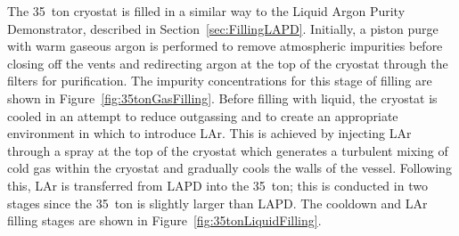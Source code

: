The 35~ton cryostat is filled in a similar way to the Liquid Argon Purity Demonstrator, described in Section~\ref{sec:FillingLAPD}.  Initially, a piston purge with warm gaseous argon is performed to remove atmospheric impurities before closing off the vents and redirecting argon at the top of the cryostat through the filters for purification.  The impurity concentrations for this stage of filling are shown in Figure~\ref{fig:35tonGasFilling}.  Before filling with liquid, the cryostat is cooled in an attempt to reduce outgassing and to create an appropriate environment in which to introduce LAr.  This is achieved by injecting LAr through a spray at the top of the cryostat which generates a turbulent mixing of cold gas within the cryostat and gradually cools the walls of the vessel.  Following this, LAr is transferred from LAPD into the 35~ton; this is conducted in two stages since the 35~ton is slightly larger than LAPD.  The cooldown and LAr filling stages are shown in Figure~\ref{fig:35tonLiquidFilling}.

